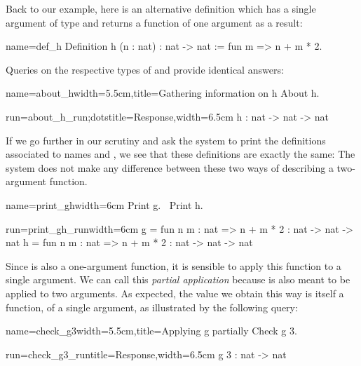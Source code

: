 Back to our example, here is an alternative definition
  which has a single argument  of type  and returns
 a function of one argument as a result:

\begin{coq}{name=def_h}{}
Definition h (n : nat) : nat -> nat := fun m => n + m * 2.
\end{coq}

Queries on the respective types of  and  provide identical answers:

\begin{coq}{name=about_h}{width=5.5cm,title=Gathering information on h}
About h.
\end{coq}
\begin{coqout}{run=about_h_run;dots}{title=Response,width=6.5cm}
h : nat -> nat -> nat
\end{coqout}

If we go further in our scrutiny and ask the \Coq{} system to print
the definitions associated to names  and , we see that these
definitions are exactly the same: The \Coq{} system does not make any
difference between these two ways of describing a two-argument function.

\begin{coq}{name=print_gh}{width=6cm}
Print g.
$~$
Print h.
$~$
\end{coq}
\begin{coqout}{run=print_gh_run}{width=6cm}
g = fun n m : nat => n + m * 2
  : nat -> nat -> nat
h = fun n m : nat => n + m * 2
  : nat -> nat -> nat
\end{coqout}

Since  is also a one-argument function, it is sensible to apply this
function to a single argument.  We can call this {\em partial application}
because  is also meant to be applied to two arguments.
As expected, the value we obtain this way is itself a function, of a
single argument, as illustrated by the following query:

\begin{coq}{name=check_g3}{width=5.5cm,title=Applying g partially}
Check g 3.
\end{coq}
\begin{coqout}{run=check_g3_run}{title=Response,width=6.5cm}
g 3 : nat -> nat
\end{coqout}

